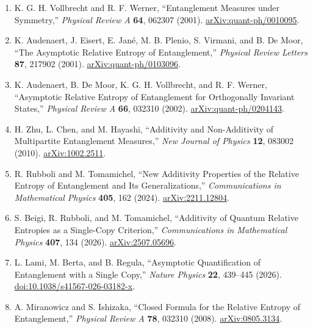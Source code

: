 \begin{enumerate}[label={},leftmargin=4.8em,labelsep=0.5em]
  \footnotesize
  \item[\textup{[VW01]}]\label{ref:rer-vollbrecht-werner}
  K. G. H. Vollbrecht and R. F. Werner,
  ``Entanglement Measures under Symmetry,'' \emph{Physical Review A}
  \textbf{64}, 062307 (2001).
  \href{https://arxiv.org/abs/quant-ph/0010095}{arXiv:quant-ph/0010095}.

  \item[\textup{[AEM+01]}]\label{ref:rer-audenaert}
  K. Audenaert, J. Eisert, E. Jan\'e, M. B. Plenio, S. Virmani, and B. De Moor,
  ``The Asymptotic Relative Entropy of Entanglement,'' \emph{Physical Review
  Letters} \textbf{87}, 217902 (2001).
  \href{https://arxiv.org/abs/quant-ph/0103096}{arXiv:quant-ph/0103096}.

  \item[\textup{[ADM+02]}]\label{ref:rer-audenaert-orthogonal}
  K. Audenaert, B. De Moor, K. G. H. Vollbrecht, and R. F. Werner,
  ``Asymptotic Relative Entropy of Entanglement for Orthogonally Invariant
  States,'' \emph{Physical Review A} \textbf{66}, 032310 (2002).
  \href{https://arxiv.org/abs/quant-ph/0204143}{arXiv:quant-ph/0204143}.

  \item[\textup{[ZCH10]}]\label{ref:rer-zhu-chen-hayashi}
  H. Zhu, L. Chen, and M. Hayashi,
  ``Additivity and Non-Additivity of Multipartite Entanglement Measures,''
  \emph{New Journal of Physics} \textbf{12}, 083002 (2010).
  \href{https://arxiv.org/abs/1002.2511}{arXiv:1002.2511}.

  \item[\textup{[RT24]}]\label{ref:rer-rubboli-tomamichel}
  R. Rubboli and M. Tomamichel,
  ``New Additivity Properties of the Relative Entropy of Entanglement and Its
  Generalizations,'' \emph{Communications in Mathematical Physics}
  \textbf{405}, 162 (2024).
  \href{https://arxiv.org/abs/2211.12804}{arXiv:2211.12804}.

  \item[\textup{[BRT26]}]\label{ref:rer-beigi}
  S. Beigi, R. Rubboli, and M. Tomamichel,
  ``Additivity of Quantum Relative Entropies as a Single-Copy Criterion,''
  \emph{Communications in Mathematical Physics} \textbf{407}, 134 (2026).
  \href{https://arxiv.org/abs/2507.05696}{arXiv:2507.05696}.

  \item[\textup{[LBR26]}]\label{ref:rer-lami}
  L. Lami, M. Berta, and B. Regula,
  ``Asymptotic Quantification of Entanglement with a Single Copy,''
  \emph{Nature Physics} \textbf{22}, 439--445 (2026).
  \href{https://doi.org/10.1038/s41567-026-03182-x}{doi:10.1038/s41567-026-03182-x}.

  \item[\textup{[MI08]}]\label{ref:rer-miranowicz}
  A. Miranowicz and S. Ishizaka,
  ``Closed Formula for the Relative Entropy of Entanglement,''
  \emph{Physical Review A} \textbf{78}, 032310 (2008).
  \href{https://arxiv.org/abs/0805.3134}{arXiv:0805.3134}.
\end{enumerate}

